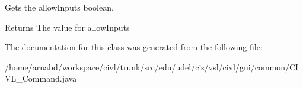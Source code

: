 Gets the allow\+Inputs boolean. 

\begin{DoxyReturn}{Returns}
The value for allow\+Inputs 
\end{DoxyReturn}


The documentation for this class was generated from the following file\+:\begin{DoxyCompactItemize}
\item 
/home/arnabd/workspace/civl/trunk/src/edu/udel/cis/vsl/civl/gui/common/C\+I\+V\+L\+\_\+\+Command.\+java\end{DoxyCompactItemize}

